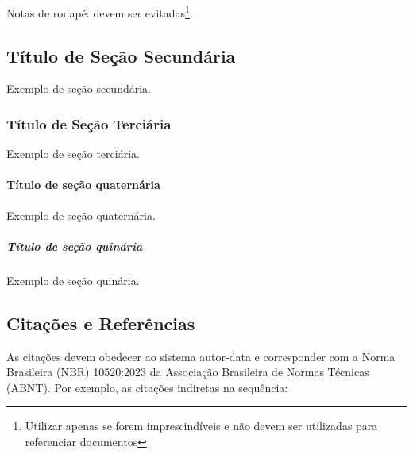 \documentclass[%
  a4paper,%
  12pt,%
  fleqn,%
  english,%
  brazilian,%
]{article}
\begin{document}
Notas de rodapé: devem ser evitadas\footnote{Utilizar apenas se forem imprescindíveis e não devem ser utilizadas para referenciar documentos}.

\subsection{Título de Seção Secundária}%
\label{ssect:lvl-2}

Exemplo de seção secundária.

\subsubsection{Título de Seção Terciária}%
\label{sssect:lvl-3}

Exemplo de seção terciária.

\paragraph{Título de seção quaternária}%
\label{prgh:lvl-4}

Exemplo de seção quaternária.

\subparagraph{Título de seção quinária}%
\label{sprgh:lvl-5}

Exemplo de seção quinária.

\subsection{Citações e Referências}%
\label{ssect:cit-ref}%

As citações devem obedecer ao sistema autor-data e corresponder com a Norma Brasileira (NBR) 10520:2023 da Associação Brasileira de Normas Técnicas (ABNT).
Por exemplo, as citações indiretas na sequência:
\end{document}
